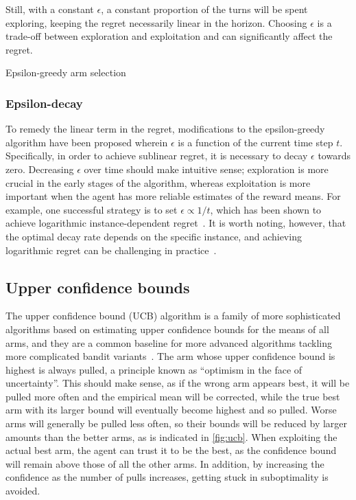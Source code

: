 Still, with a constant $\epsilon$, a constant proportion of the turns will be spent exploring, keeping the regret necessarily linear in the horizon.
Choosing $\epsilon$ is a trade-off between exploration and exploitation and can significantly affect the regret.

\begin{algorithm}
    \caption{Epsilon-greedy arm selection}
    \label{alg:eps_greedy}
    \eIf{$t \leq mk$}{
    \Return $(t \mod k) + 1$\;
    }{
    Sample $u$ from $[0,1)$ uniformly\;
    \eIf{$u < \epsilon$}{
        Sample $a$ from $\mathcal{A}$ uniformly\;
        \Return $a$\;
    }{
        \Return $\argmax_{a \in \mathcal{A}}\hat{\mu}_a$\;
    }
    }
\end{algorithm}

\subsubsection{Epsilon-decay}
To remedy the linear term in the regret, modifications to the epsilon-greedy algorithm have been proposed wherein $\epsilon$ is a function of the current time step $t$.
Specifically, in order to achieve sublinear regret, it is necessary to decay $\epsilon$ towards zero.
Decreasing $\epsilon$ over time should make intuitive sense; exploration is more crucial in the early stages of the algorithm, whereas exploitation is more important when the agent has more reliable estimates of the reward means.
For example, one successful strategy is to set $\epsilon \propto 1/t$, which has been shown to achieve logarithmic instance-dependent regret~\autocite{auer2002}.
It is worth noting, however, that the optimal decay rate depends on the specific instance, and achieving logarithmic regret can be challenging in practice~\autocite{bubeck2012}.


\subsection{Upper confidence bounds}
\label{sec:ucb}
The upper confidence bound (UCB) algorithm is a family of more sophisticated algorithms based on estimating upper confidence bounds for the means of all arms, and they are a common baseline for more advanced algorithms tackling more complicated bandit variants~\autocite{li2010}.
The arm whose upper confidence bound is highest is always pulled, a principle known as \enquote{optimism in the face of uncertainty}.
This should make sense, as if the wrong arm appears best, it will be pulled more often and the empirical mean will be corrected, while the true best arm with its larger bound will eventually become highest and so pulled.
Worse arms will generally be pulled less often, so their bounds will be reduced by larger amounts than the better arms, as is indicated in \cref{fig:ucb}.
When exploiting the actual best arm, the agent can trust it to be the best, as the confidence bound will remain above those of all the other arms.
In addition, by increasing the confidence as the number of pulls increases, getting stuck in suboptimality is avoided.


